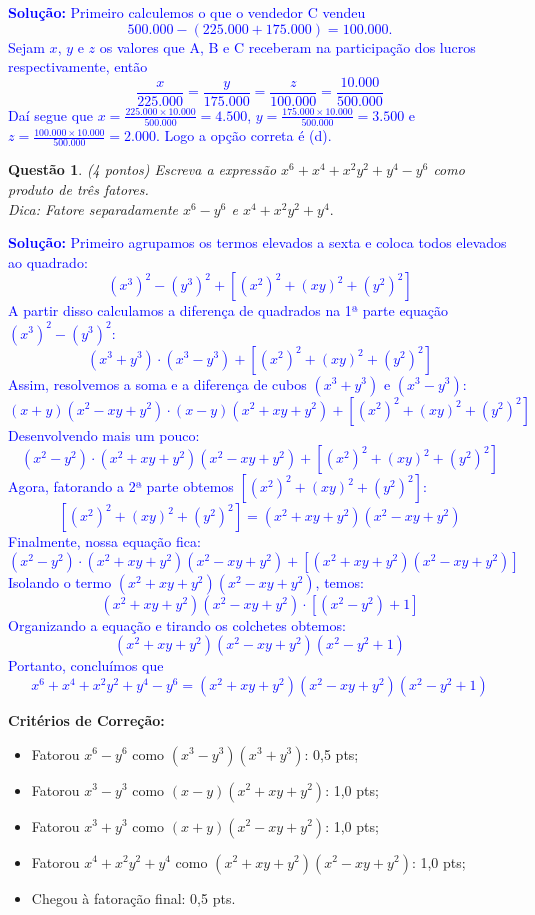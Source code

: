 \documentclass[oneside,a4paper,12pt]{article}
\theoremstyle{Colorido}
\theoremstyle{solu}
\theoremstyle{dotlessP}
\newcommand{\solucao}[1]{\textcolor{blue}{\textbf{Solução:} #1}}
\newtheorem{sol}{Questão}
\begin{document}
\solucao{Primeiro calculemos o que o vendedor C vendeu
\[500.000 - (225.000 + 175.000)=100.000.\]
Sejam $x$, $y$ e $z$ os valores que A, B e C receberam na participação dos lucros respectivamente, então
\[\frac{x}{225.000}=\frac{y}{175.000}=\frac{z}{100.000}=\frac{10.000}{500.000}\]
Daí segue que $x=\frac{225.000 \times 10.000}{500.000}=4.500$, $y=\frac{175.000 \times 10.000}{500.000}=3.500$ e $z=\frac{100.000 \times 10.000}{500.000}=2.000$. Logo a opção correta é (d).
}
\newpage
	\begin{sol}
\textit{(4 pontos)} \newline \newline
Escreva a expressão $x^6+x^4+x^2y^2+y^4-y^6$ como produto de três fatores.\\
\textsf{Dica:} Fatore separadamente $x^6-y^6$ e $x^4+x^2y^2+y^4.$
\end{sol}
\solucao{Primeiro agrupamos os termos elevados a sexta e coloca todos elevados ao quadrado:
\[(x^3)^2 - (y^3)^2 + [(x^2)^2 + (xy)^2 + (y^2)^2]\]
A partir disso calculamos a diferença de quadrados na 1ª parte equação $(x^3)^2 - (y^3)^2:$
\[(x^3 + y^3) \cdot (x^3 - y^3) + [(x^2)^2 + (xy)^2 + (y^2)^2]\]
Assim, resolvemos a soma e a diferença de cubos $(x^3 + y^3)$ e $(x^3 - y^3):$\[(x+y) (x^2 - xy + y^2) \cdot (x-y) (x^2 + xy + y^2) + [(x^2)^2 + (xy)^2 + (y^2)^2]\]
Desenvolvendo mais um pouco:\[(x^2 - y^2) \cdot (x^2 + xy + y^2)(x^2 - xy + y^2) + [(x^2)^2 + (xy)^2 + (y^2)^2]\] 
Agora, fatorando a 2ª parte obtemos $ [(x^2)^2 + (xy)^2 + (y^2)^2]: $
\[[(x^2)^2 + (xy)^2 + (y^2)^2] = (x^2 + xy +y^2)(x^2 - xy +y^2)\]
Finalmente, nossa equação fica:\[(x^2 - y^2) \cdot (x^2 + xy + y^2)(x^2 - xy + y^2) + [(x^2 + xy +y^2)(x^2 - xy +y^2)]\]
Isolando o termo $(x^2 + xy +y^2)(x^2 - xy +y^2)$, temos:\[(x^2 + xy +y^2)(x^2 - xy +y^2) \cdot [(x^2 - y^2) +1]\]
Organizando a equação e tirando os colchetes obtemos:\[(x^2 + xy +y^2) (x^2 - xy +y^2)(x^2 - y^2 +1)\]
Portanto, concluímos que
\[\boxed{x^6+x^4+x^2y^2+y^4-y^6 = (x^2 + xy +y^2) (x^2 - xy +y^2) (x^2 - y^2 +1)}\]}
\begin{mdframed}
\textbf{Critérios de Correção:} \\
\begin{itemize}
    \item Fatorou $x^6 - y^6$ como $(x^3-y^3)(x^3+y^3)$: 0,5 pts;
    \item Fatorou $x^3 - y^3$ como $(x-y)(x^2 + xy + y^2)$: 1,0 pts;
    \item Fatorou $x^3 + y^3$ como $(x+y)(x^2 - xy + y^2)$: 1,0 pts;
    \item Fatorou $x^4 + x^2y^2 + y^4$ como $(x^2 + xy + y^2)(x^2 - xy + y^2)$: 1,0 pts;
    \item Chegou à fatoração final: 0,5 pts.
    \end{itemize}
    \end{mdframed}
\end{document}
